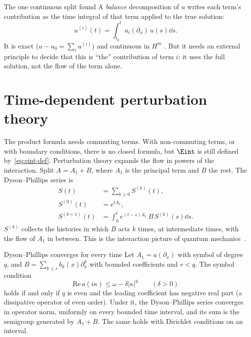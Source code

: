 \begin{aside}{The one continuous split found}
A \emph{balance} decomposition of $u$ writes each term's contribution as the time integral of that term applied to the true solution:
\[
u^{(i)}(t)=\int_{t_0}^{t}a_i(\partial_x)\,u(s)\dd s .
\]
It is exact ($u-u_0=\sum_iu^{(i)}$) and continuous in $H^m$  \pw. But it needs an external principle to decide that this is ``the'' contribution of term $i$: it uses the full solution, not the flow of the term alone.
\end{aside}

\section{Time-dependent perturbation theory}

The product formula needs commuting terms. With non-commuting terms, or with boundary conditions, there is no closed formula, but $\Eint$ is still defined by~\eqref{eq:eint-def}. Perturbation theory expands the flow in powers of the interaction. Split $A=A_1+B$, where $A_1$ is the principal term and $B$ the rest. The Dyson--Phillips series is
\begin{equation}\label{eq:dyson}
\begin{aligned}
S(t)&=\sum_{k\ge0}S^{(k)}(t),\\
S^{(0)}(t)&=e^{tA_1},\\
S^{(k+1)}(t)&=\int_0^te^{(t-s)A_1}\,B\,S^{(k)}(s)\dd s .
\end{aligned}
\end{equation}
$S^{(k)}$ collects the histories in which $B$ acts $k$ times, at intermediate times, with the flow of $A_1$ in between. This is the interaction picture of quantum mechanics~\cite{dy}.

\begin{theorem}{Dyson--Phillips converges for every time  \proved}\label{thm:dyson}
Let $A_1=a(\partial_x)$ with symbol of degree $q$, and $B=\sum_{k\le r}b_k(x)\partial_x^k$ with bounded coefficients and $r<q$. The symbol condition
\[
\mathrm{Re}\,a(i\kappa)\le\omega-\delta|\kappa|^q\qquad(\delta>0)
\]
holds if and only if $q$ is even and the leading coefficient has negative real part (a dissipative operator of even order). Under it, the Dyson--Phillips series converges in operator norm, uniformly on every bounded time interval, and its sum is the semigroup generated by $A_1+B$. The same holds with Dirichlet conditions on an interval.

\end{theorem}

